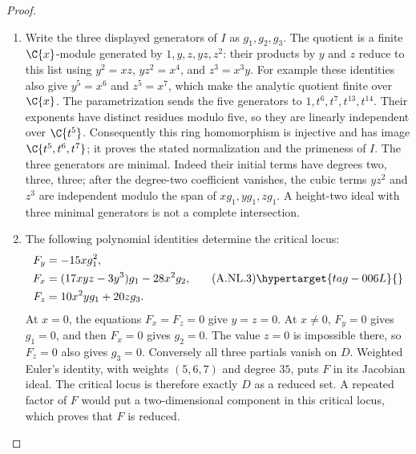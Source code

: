 \begin{proof}

\begin{enumerate}[label={$\langle1\rangle$\arabic*.},leftmargin=*]
\item Write the three displayed generators of $I$ as $g_1,g_2,g_3$.
The quotient is a finite $\C\{x\}$-module generated by
$1,y,z,yz,z^2$: their products by $y$ and $z$ reduce to this list
using $y^2=xz$, $yz^2=x^4$, and $z^3=x^3y$.
For example these identities also give $y^5=x^6$ and $z^5=x^7$,
which make the analytic quotient finite over $\C\{x\}$.
The parametrization sends the five generators to
$1,t^6,t^7,t^{13},t^{14}$. Their exponents have distinct residues
modulo five, so they are linearly independent over $\C\{t^5\}$.
Consequently this ring homomorphism is injective and has
image $\C\{t^5,t^6,t^7\}$; it proves the stated normalization and
the primeness of $I$. The three generators are minimal. Indeed their
initial terms have degrees two, three, three; after the degree-two
coefficient vanishes, the cubic terms $yz^2$ and $z^3$ are independent
modulo the span of $xg_1,yg_1,zg_1$. A height-two ideal with three
minimal generators is not a complete intersection.

\item The following polynomial identities determine the critical locus:
\[
 \begin{aligned}
 F_y&=-15xg_1^2,\\
 F_x&=(17xyz-3y^3)g_1-28x^2g_2,\\
 F_z&=10x^2yg_1+20zg_3.
 \end{aligned}                                                   \tag{A.NL.3}\hypertarget{tag-006L}{}\label{cdp:eq:A.NL.3}
\]
At $x=0$, the equations $F_x=F_z=0$ give $y=z=0$.
At $x\ne0$, $F_y=0$ gives $g_1=0$, and then $F_x=0$
gives $g_2=0$. The value $z=0$ is impossible there, so $F_z=0$
also gives $g_3=0$. Conversely all three partials vanish on $D$.
Weighted Euler's identity, with weights $(5,6,7)$ and degree $35$,
puts $F$ in its Jacobian ideal. The critical locus is therefore
exactly $D$ as a reduced set. A repeated factor of $F$ would put
a two-dimensional component in this critical locus, which proves
that $F$ is reduced.


\end{enumerate}
\end{proof}
